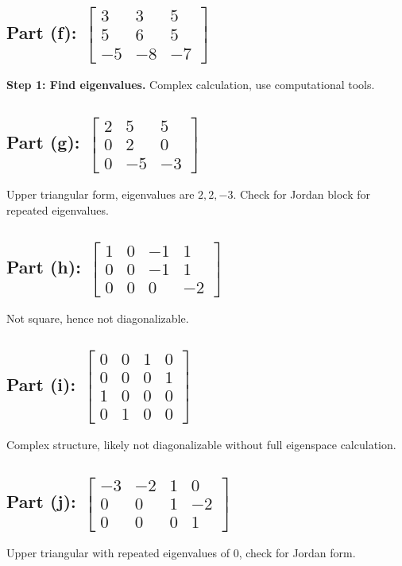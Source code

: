 \documentclass[12pt]{article}
\begin{document}
\subsection*{Part (f): \( \begin{bmatrix} 3 & 3 & 5 \\ 5 & 6 & 5 \\ -5 & -8 & -7 \end{bmatrix} \)}
\textbf{Step 1: Find eigenvalues.} Complex calculation, use computational tools.

\subsection*{Part (g): \( \begin{bmatrix} 2 & 5 & 5 \\ 0 & 2 & 0 \\ 0 & -5 & -3 \end{bmatrix} \)}
Upper triangular form, eigenvalues are \(2, 2, -3\). Check for Jordan block for repeated eigenvalues.

\subsection*{Part (h): \( \begin{bmatrix} 1 & 0 & -1 & 1 \\ 0 & 0 & -1 & 1 \\ 0 & 0 & 0 & -2 \end{bmatrix} \)}
Not square, hence not diagonalizable.

\subsection*{Part (i): \( \begin{bmatrix} 0 & 0 & 1 & 0 \\ 0 & 0 & 0 & 1 \\ 1 & 0 & 0 & 0 \\ 0 & 1 & 0 & 0 \end{bmatrix} \)}
Complex structure, likely not diagonalizable without full eigenspace calculation.

\subsection*{Part (j): \( \begin{bmatrix} -3 & -2 & 1 & 0 \\ 0 & 0 & 1 & -2 \\ 0 & 0 & 0 & 1 \end{bmatrix} \)}
Upper triangular with repeated eigenvalues of 0, check for Jordan form.
\end{document}
